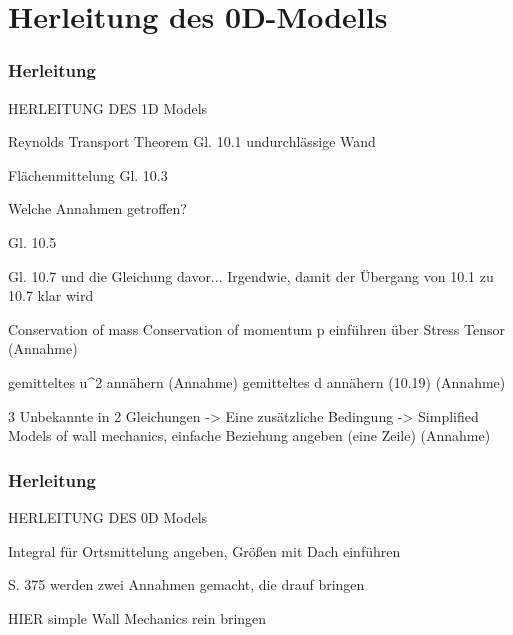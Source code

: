 \section{Herleitung des 0D-Modells}

\begin{frame}
\frametitle{Herleitung}

HERLEITUNG DES 1D Models

Reynolds Transport Theorem Gl. 10.1
  undurchlässige Wand

Flächenmittelung Gl. 10.3

Welche Annahmen getroffen?

Gl. 10.5

Gl. 10.7 und die Gleichung davor... Irgendwie, damit der Übergang von
10.1 zu 10.7 klar wird

Conservation of mass
Conservation of momentum
  p einführen über Stress Tensor (Annahme)

gemitteltes u^2 annähern (Annahme)
gemitteltes d annähern (10.19) (Annahme)

3 Unbekannte in 2 Gleichungen -> Eine zusätzliche Bedingung -> Simplified
Models of wall mechanics, einfache Beziehung angeben (eine Zeile) (Annahme)



\end{frame}



\begin{frame}\frametitle{Herleitung}

  HERLEITUNG DES 0D Models

  Integral für Ortsmittelung angeben, Größen mit Dach einführen

  S. 375 werden zwei Annahmen gemacht, die drauf bringen

  HIER simple Wall Mechanics rein bringen

\end{frame}
